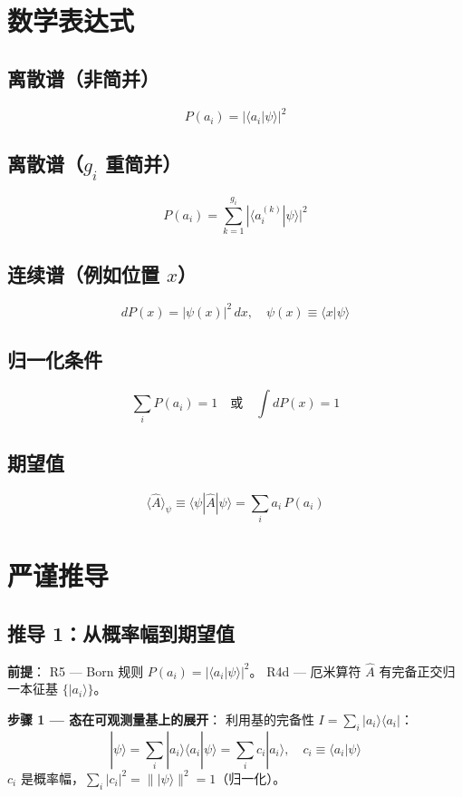 \section{数学表达式}

\subsection{离散谱（非简并）}
\[
P(a_i) = |\langle a_i | \psi \rangle|^2
\]

\subsection{离散谱（$g_i$ 重简并）}
\[
P(a_i) = \sum_{k=1}^{g_i} |\langle a_i^{(k)} | \psi \rangle|^2
\]

\subsection{连续谱（例如位置 $x$）}
\[
dP(x) = |\psi(x)|^2\, dx, \quad \psi(x) \equiv \langle x | \psi \rangle
\]

\subsection{归一化条件}
\[
\sum_i P(a_i) = 1 \quad \text{或} \quad \int dP(x) = 1
\]

\subsection{期望值}
\[
\langle \hat{A} \rangle_\psi \equiv \langle\psi|\hat{A}|\psi\rangle = \sum_i a_i\, P(a_i)
\]

\section{严谨推导}

\subsection{推导 1：从概率幅到期望值}

\textbf{前提}：\fbox{[N]} R5 — Born 规则 $P(a_i) = |\langle a_i|\psi\rangle|^2$。\fbox{[N]} R4d — 厄米算符 $\hat{A}$ 有完备正交归一本征基 $\{|a_i\rangle\}$。

\textbf{步骤 1 — 态在可观测量基上的展开}：\fbox{[S]} 利用基的完备性 $I = \sum_i |a_i\rangle\langle a_i|$：
\begin{equation}
|\psi\rangle = \sum_i |a_i\rangle\langle a_i|\psi\rangle
= \sum_i c_i |a_i\rangle, \quad c_i \equiv \langle a_i|\psi\rangle
\end{equation}
\fbox{[S]} $c_i$ 是概率幅，$\sum_i |c_i|^2 = \||\psi\rangle\|^2 = 1$（归一化）。

